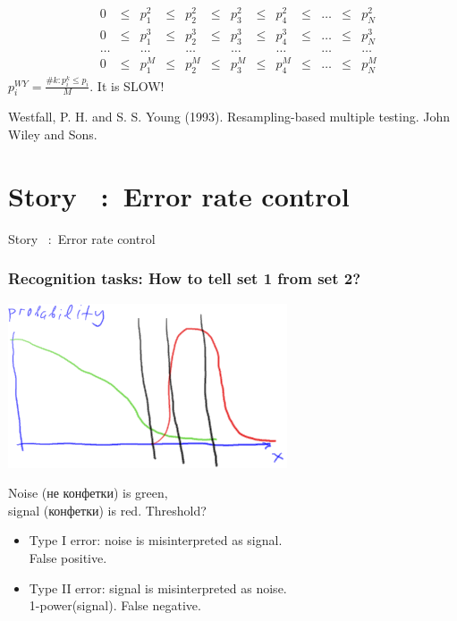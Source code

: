 \documentclass{beamer}
\newcounter{story}
\begin{document}
\begin{frame}
\begin{center}
{\begin{align*}
				&0   & \leq &   p_1^2  & \leq &  p_2^2  & \leq &  p_3^2  & \leq &  p_4^2  & \leq &  \ldots  & \leq &  p_N^2 \\
				&0   & \leq &   p_1^3  & \leq &  p_2^3  & \leq &  p_3^3  & \leq &  p_4^3  & \leq &  \ldots  & \leq &  p_N^3 \\
				& \ldots &&  \ldots && \ldots && \ldots && \ldots && \ldots && \ldots \\
				&0   & \leq &   p_1^M  & \leq &  p_2^M  & \leq &  p_3^M  & \leq &  p_4^M  & \leq &  \ldots  & \leq &  p_N^M
				\end{align*}}\normalsize{}
		$p_i^{WY} = \displaystyle\frac{\#k: p_i^k \leq p_i }{M}$. It is SLOW!
		\end{center}
		\small{Westfall, P. H. and S. S. Young (1993). Resampling-based multiple testing. John Wiley and Sons.}
	\end{frame}

\addtocounter{story}{1}
\section{Story \ :\ Error rate control}
	\begin{frame}
		\begin{center}
			\huge{Story \ :\ Error rate control}
		\end{center}
	\end{frame}

	\begin{frame}
		\frametitle{Recognition tasks: How to tell set 1 from set 2?}
		\begin{center}
			\includegraphics[scale=0.6]{discriminate}


			Noise (не конфетки) is green, \\ signal (конфетки) is red. Threshold?
		\end{center}
		\begin{itemize}
		\item Type I error: noise is misinterpreted as signal. \\ False positive.
		\item Type II error: signal is misinterpreted as noise. \\ 1-power(signal). False negative.
		\end{itemize}
	\end{frame}
\end{document}
